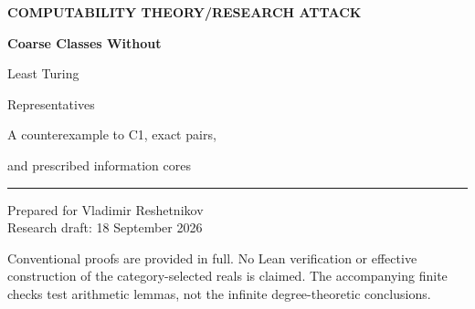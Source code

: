 \documentclass[11pt,a4paper]{article}
\theoremstyle{definition}\newtheorem{definition}[theorem]{Definition}
\theoremstyle{remark}\newtheorem{remark}[theorem]{Remark}
\begin{document}
\begin{titlepage}
\vspace*{11mm}
{\small\sffamily\bfseries\color{navy}COMPUTABILITY THEORY\quad /\quad RESEARCH ATTACK\par}
\vspace{14mm}
{\Huge\bfseries\color{navy}Coarse Classes Without\par Least Turing\par Representatives\par}
\vspace{8mm}
{\Large A counterexample to C1, exact pairs,\par and prescribed information cores\par}
\vspace{12mm}
\noindent\rule{\textwidth}{0.5pt}
\vspace{4mm}
\noindent Prepared for Vladimir Reshetnikov\\[3pt]
Research draft: 18 September 2026
\vspace{8mm}
\begin{abstract}
We attack C1 from the supplied unified report: must a nonuniform coarse-equivalence class contain a representative of least Turing degree? The answer is negative. We give an explicit complete computably enumerable set $X$ with no computable coarse description and prove that a density-zero modification $D$ of $X$ can form a Turing minimal pair with $X$.

The main structural argument treats the coarse descriptions of an arbitrary set as a complete separable space under a prefix-density metric. A local finite-perturbation recovery lemma makes every avoidable Turing cone meager. It follows that the information common to all coarse descriptions is realized as the exact common lower cone of $X$ and one coarse description, and also as that of every distinct pair in a suitable Cantor family. Relativized counterexamples have any prescribed principal information core, but no representative at its generating degree.

The negative answer to C1 is already a consequence of older cone-avoidance results. It is not presented as a newly resolved literature-open problem. The exact-pair and prescribed-core formulations are proved here; their bibliographic novelty has not been established.
\end{abstract}
\vfill
\noindent\small Conventional proofs are provided in full. No Lean verification or effective construction of the category-selected reals is claimed. The accompanying finite checks test arithmetic lemmas, not the infinite degree-theoretic conclusions.
\end{titlepage}
{\small\tableofcontents}
\newpage
\end{document}

